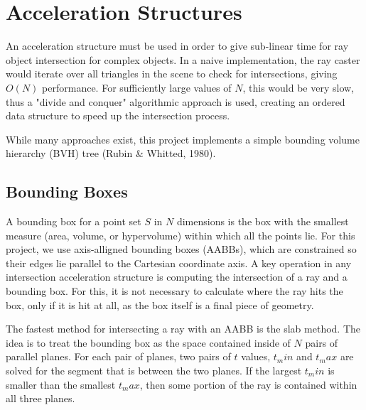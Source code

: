 \documentclass[12pt]{report}
\begin{document}
\section{Acceleration Structures}

An acceleration structure must be used in order to give sub-linear time for ray object intersection for complex objects.
In a naive implementation, the ray caster would iterate over all triangles in the scene to check for intersections, giving $O(N)$ performance.
For sufficiently large values of $N$, this would be very slow, thus a "divide and conquer" algorithmic approach is used, creating an ordered data structure to speed up the intersection process.

While many approaches exist, this project implements a simple bounding volume hierarchy (BVH) tree (Rubin \& Whitted, 1980).

\subsection{Bounding Boxes}

A bounding box for a point set $S$ in $N$ dimensions is the box with the smallest measure (area, volume, or hypervolume) within which all the points lie.
For this project, we use axis-alligned bounding boxes (AABBs), which are constrained so their edges lie parallel to the Cartesian coordinate axis.
A key operation in any intersection acceleration structure is computing the intersection of a ray and a bounding box.
For this, it is not necessary to calculate where the ray hits the box, only if it is hit at all, as the box itself is a final piece of geometry.

The fastest method for intersecting a ray with an AABB is the slab method.
The idea is to treat the bounding box as the space contained inside of $N$ pairs of parallel planes.
For each pair of planes, two pairs of $t$ values, $t_min$ and $t_max$ are solved for the segment that is between the two planes.
If the largest $t_min$ is smaller than the smallest $t_max$, then some portion of the ray is contained within all three planes.
\end{document}
